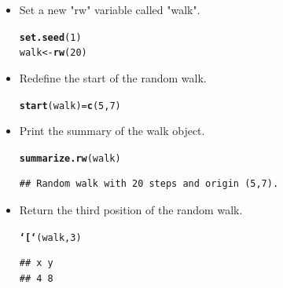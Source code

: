 \documentclass{llncs}\usepackage[]{graphicx}\usepackage[]{color}
\makeatletter
\newcommand{\hlnum}[1]{\textcolor[rgb]{0.686,0.059,0.569}{#1}}%
\newcommand{\hlstd}[1]{\textcolor[rgb]{0.345,0.345,0.345}{#1}}%
\newcommand{\hlkwb}[1]{\textcolor[rgb]{0.69,0.353,0.396}{#1}}%
\newcommand{\hlkwd}[1]{\textcolor[rgb]{0.737,0.353,0.396}{\textbf{#1}}}%
\newenvironment{kframe}{%
 \def\at@end@of@kframe{}%
 \ifinner\ifhmode%
  \def\at@end@of@kframe{\end{minipage}}%
  \begin{minipage}{\columnwidth}%
 \fi\fi%
 \def\FrameCommand##1{\hskip\@totalleftmargin \hskip-\fboxsep
 \colorbox{shadecolor}{##1}\hskip-\fboxsep
     \hskip-\linewidth \hskip-\@totalleftmargin \hskip\columnwidth}%
 \MakeFramed {\advance\hsize-\width
   \@totalleftmargin\z@ \linewidth\hsize
   \@setminipage}}%
 {\par\unskip\endMakeFramed%
 \at@end@of@kframe}
\newenvironment{knitrout}{}{} %
\makeatother
\begin{document}
\begin{itemize}
\item Set a new "rw" variable called "walk".
\begin{knitrout}
\color{fgcolor}\begin{kframe}
\begin{alltt}
\hlkwd{set.seed}\hlstd{(}\hlnum{1}\hlstd{)}
\hlstd{walk} \hlkwb{<-} \hlkwd{rw}\hlstd{(}\hlnum{20}\hlstd{)}
\end{alltt}
\end{kframe}
\end{knitrout}

\item Redefine the start of the random walk.
\begin{knitrout}
\color{fgcolor}\begin{kframe}
\begin{alltt}
\hlkwd{start}\hlstd{(walk)} \hlkwb{=} \hlkwd{c}\hlstd{(}\hlnum{5}\hlstd{,} \hlnum{7}\hlstd{)}
\end{alltt}
\end{kframe}
\end{knitrout}
\item Print the summary of the walk object.
\begin{knitrout}
\color{fgcolor}\begin{kframe}
\begin{alltt}
\hlkwd{summarize.rw}\hlstd{(walk)}
\end{alltt}
\begin{lstlisting}[basicstyle=\ttfamily,breaklines=true]
## Random walk with 20 steps and origin (5,7).
\end{lstlisting}
\end{kframe}
\end{knitrout}
\item Return the third position of the random walk.
\begin{knitrout}
\color{fgcolor}\begin{kframe}
\begin{alltt}
\hlkwd{`[`}\hlstd{(walk,}\hlnum{3}\hlstd{)}
\end{alltt}
\begin{lstlisting}[basicstyle=\ttfamily,breaklines=true]
## x y 
## 4 8
\end{lstlisting}
\end{kframe}

\end{knitrout}
\end{itemize}
\end{document}
